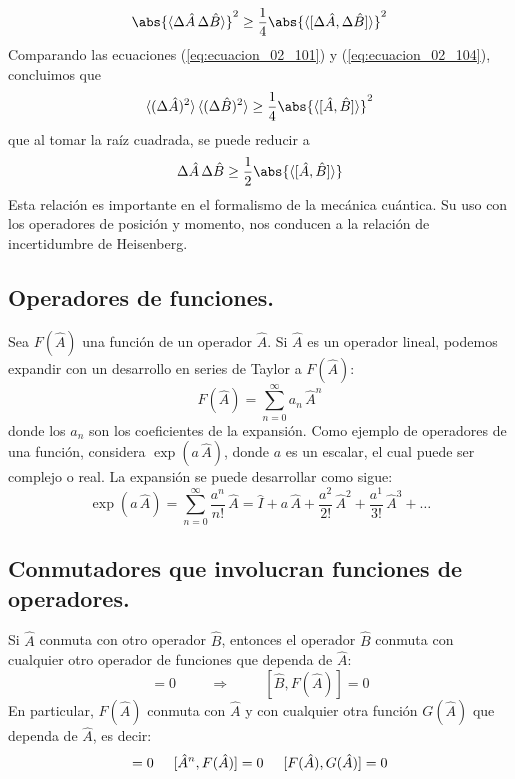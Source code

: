 \begin{equation}
\abs{ \langle \Delta \hat{A} \, \Delta \hat{B} \rangle}^{2} \geq \dfrac{1}{4} \abs{\langle [ \Delta \hat{A}, \Delta \hat{B} ] \rangle}^{2}
\label{eq:ecuacion_02_104}
\end{equation}
Comparando las ecuaciones (\ref{eq:ecuacion_02_101}) y (\ref{eq:ecuacion_02_104}), concluimos que
\begin{equation}
\langle (\Delta \hat{A})^{2} \rangle \, \langle (\Delta \hat{B})^{2} \rangle \geq \dfrac{1}{4} \abs{\langle [ \hat{A}, \hat{B} ] \rangle}^{2}
\label{eq:ecuacion_02_105}
\end{equation}
que al tomar la raíz cuadrada, se puede reducir a
\begin{equation}
\Delta \hat{A} \, \Delta \hat{B} \geq \dfrac{1}{2} \abs{\langle [ \hat{A}, \hat{B} ] \rangle}
\label{eq:ecuacion_02_106}
\end{equation}
Esta relación es importante en el formalismo de la mecánica cuántica. Su uso con los operadores de posición y momento, nos conducen a la relación de incertidumbre de Heisenberg.
\subsection{Operadores de funciones.}
Sea $F(\hat{A})$ una función de un operador $\hat{A}$. Si $\hat{A}$ es un operador lineal, podemos expandir con un desarrollo en series de Taylor a $F(\hat{A})$:
\begin{equation}
F(\hat{A}) = \sum_{n=0}^{\infty} a_{n} \, \hat{A}^{n}
\label{eq:ecuacion_02_108}
\end{equation}
donde los $a_{n}$ son los coeficientes de la expansión. Como ejemplo de operadores de una función, considera $\exp(a \, \hat{A})$, donde $a$ es un escalar, el cual puede ser complejo o real. La expansión se puede desarrollar como sigue:
\begin{equation}
\exp(a \, \hat{A}) = \sum_{n=0}^{\infty} \dfrac{a^{n}}{n!} \, \hat{A} = \hat{I} + a \, \hat{A} + \dfrac{a^{2}}{2!} \, \hat{A}^{2} + \dfrac{a^{1}}{3!} \, \hat{A}^{3} + \ldots
\label{eq:ecuacion_02_109}
\end{equation}
\subsection*{Conmutadores que involucran funciones de operadores.}
Si $\hat{A}$ conmuta con otro operador $\hat{B}$, entonces el operador $\hat{B}$ conmuta con cualquier otro operador de funciones que dependa de $\hat{A}$:
\begin{equation}
[\hat{A}, \hat{B}] = 0 \hspace{1cm} \Longrightarrow \hspace{1cm} [\hat{B}, F(\hat{A})] = 0
\label{eq:ecuacion_02_110}
\end{equation}
En particular, $F(\hat{A})$ conmuta con $\hat{A}$ y con cualquier otra función $G(\hat{A})$ que dependa de $\hat{A}$, es decir:
\begin{equation}
[\hat{A}, F(\hat{A})] = 0 \hspace{0.5cm} [\hat{A}^{n}, F(\hat{A})]= 0 \hspace{0.5cm} [F(\hat{A}), G(\hat{A})] = 0
\label{eq:ecuacion_02_111}
\end{equation}
